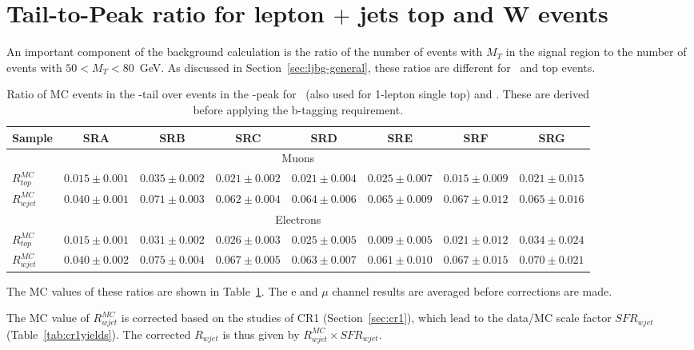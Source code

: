 \section{Tail-to-Peak ratio for lepton $+$ jets top and W events}
\label{sec:ttp}

An important component
of the background calculation is the ratio of the number of events with $M_T$ in the signal region
to the number of events with $50 < M_T < 80$~GeV.  
As discussed in Section~\ref{sec:ljbg-general}, these ratios are different for \wjets\ and 
top events.  



\begin{table}[!h]
\begin{center}
{\footnotesize
\begin{tabular}{l||c|c|c|c|c|c|c}
\hline
Sample              & SRA & SRB & SRC & SRD & SRE & SRF & SRG\\
\hline
\hline
\multicolumn{8}{c}{Muons} \\
\hline
$R^{MC}_{top}$ 	  & $0.015 \pm 0.001$  & $0.035 \pm 0.002$  & $0.021 \pm 0.002$  & $0.021 \pm 0.004$  & $0.025 \pm 0.007$  & $0.015 \pm 0.009$  & $0.021 \pm 0.015$  \\
$R^{MC}_{wjet}$ 	  & $0.040 \pm 0.001$  & $0.071 \pm 0.003$  & $0.062 \pm 0.004$  & $0.064 \pm 0.006$  & $0.065 \pm 0.009$  & $0.067 \pm 0.012$  & $0.065 \pm 0.016$  \\
\hline
\hline
\hline
\multicolumn{8}{c}{Electrons} \\
\hline
$R^{MC}_{top}$ 	  & $0.015 \pm 0.001$  & $0.031 \pm 0.002$  & $0.026 \pm 0.003$  & $0.025 \pm 0.005$  & $0.009 \pm 0.005$  & $0.021 \pm 0.012$  & $0.034 \pm 0.024$  \\
$R^{MC}_{wjet}$ 	  & $0.040 \pm 0.002$  & $0.075 \pm 0.004$  & $0.067 \pm 0.005$  & $0.063 \pm 0.007$  & $0.061 \pm 0.010$  & $0.067 \pm 0.015$  & $0.070 \pm 0.021$  \\
\hline
\end{tabular}}
\caption{ Ratio of MC events in the \mt-tail over events in the \mt-peak for
  \ttsl\ (also used for 1-lepton single top) and \wjets. These are
  derived before applying the b-tagging requirement.  
\label{tab:ttp}}
\end{center}
\end{table}

The MC values of these ratios are shown in Table~\ref{tab:ttp}. The e and $\mu$ channel results are averaged before corrections are made.

The MC value of $R^{MC}_{wjet}$ is corrected based on the studies of CR1 (Section~\ref{sec:cr1}), which
lead to the data/MC scale factor $SFR_{wjet}$ (Table~\ref{tab:cr1yields}). The corrected $R_{wjet}$ is thus given by $R^{MC}_{wjet} \times SFR_{wjet}$.

